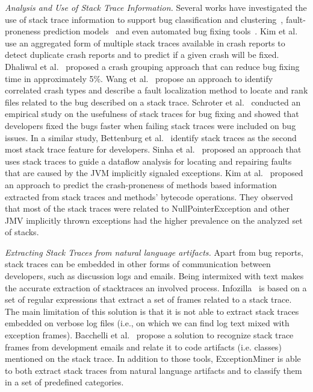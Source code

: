 \documentclass[conference]{IEEEtran}
\begin{document}
\textit{Analysis and Use of Stack Trace Information.} Several works have
investigated the use of stack trace information to support bug classification
and clustering~\cite{wang2013improving, kim2011crash, dhaliwal2011classifying},
fault-proneness prediction models~\cite{kim2013predicting} and even automated
bug fixing tools~\cite{sinha2009fault}. Kim et al.~\cite{kim2011crash} use an
aggregated form of multiple stack traces available in crash reports to detect
duplicate crash reports and to predict if a given crash will be fixed. Dhaliwal
et al.~\cite{dhaliwal2011classifying} proposed a crash grouping approach that
can reduce bug fixing time in approximately 5\%. Wang et
al.~\cite{wang2013improving} propose an approach to identify correlated crash
types and describe a fault localization method to locate and rank files related
to the bug described on a stack trace. Schroter et al.~\cite{schroter2010stack}
conducted an empirical study on the usefulness of stack traces for bug fixing
and showed that developers fixed the bugs faster when failing stack traces were
included on bug issues.  In a similar study, Bettenburg et
al.~\cite{bettenburg2008makes} identify stack traces as the second most stack
trace feature for developers.  Sinha et al.~\cite{sinha2009fault} proposed an
approach that uses stack traces to guide a dataflow analysis for locating and
repairing faults that are caused by the JVM implicitly signaled exceptions. Kim
at al.~\cite{kim2013predicting} proposed an approach to predict the
crash-proneness of methods based information extracted from stack traces and
methods' bytecode operations.  They observed that most of the stack traces were
related to NullPointerException and other JMV implicitly thrown exceptions had
the higher prevalence on the analyzed set of stacks.

\textit{Extracting Stack Traces from natural language artifacts.} 
Apart from bug reports, stack traces can be embedded in other forms of
communication between developers, such as discussion logs and emails.
Being intermixed with text makes the accurate extraction of stacktraces 
an involved process.
Infozilla~\cite{bettenburg2008extracting}
is based on a set of regular expressions that extract a set of frames
related to a stack trace. The main limitation of this solution is that it is not
able to extract stack traces embedded on verbose log files (i.e., on which we
can find log text mixed with exception frames). Bacchelli
et al.~\cite{bacchelli2012content} propose a solution to recognize stack trace frames
from development emails and relate it to code artifacts (i.e. classes) mentioned
on the stack trace. In addition to those tools, ExceptionMiner is able to 
both extract stack traces from natural language artifacts and to 
classify them in a set of predefined categories.
\end{document}
